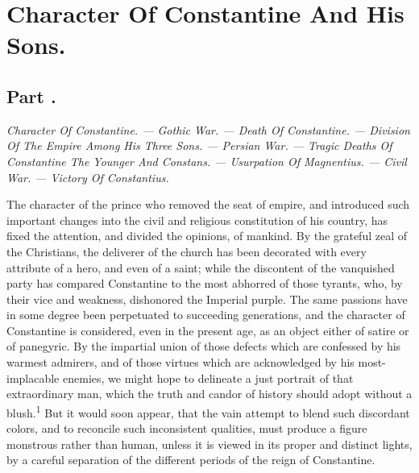 \chapter{Character Of Constantine And His Sons.}
\section{Part \thesection.}

\textit{Character Of Constantine. — Gothic War. — Death Of
Constantine. — Division Of The Empire Among His Three Sons. — Persian
War. — Tragic Deaths Of Constantine The Younger And
Constans. — Usurpation Of Magnentius. — Civil War. — Victory Of
Constantius.}
\vspace{\onelineskip}

The character of the prince who removed the seat of empire, and
introduced such important changes into the civil and religious
constitution of his country, has fixed the attention, and divided
the opinions, of mankind. By the grateful zeal of the Christians,
the deliverer of the church has been decorated with every
attribute of a hero, and even of a saint; while the discontent of
the vanquished party has compared Constantine to the most
abhorred of those tyrants, who, by their vice and weakness,
dishonored the Imperial purple. The same passions have in some
degree been perpetuated to succeeding generations, and the
character of Constantine is considered, even in the present age,
as an object either of satire or of panegyric. By the impartial
union of those defects which are confessed by his warmest
admirers, and of those virtues which are acknowledged by his
most-implacable enemies, we might hope to delineate a just
portrait of that extraordinary man, which the truth and candor of
history should adopt without a blush.\textsuperscript{1} But it would soon appear,
that the vain attempt to blend such discordant colors, and to
reconcile such inconsistent qualities, must produce a figure
monstrous rather than human, unless it is viewed in its proper
and distinct lights, by a careful separation of the different
periods of the reign of Constantine.


